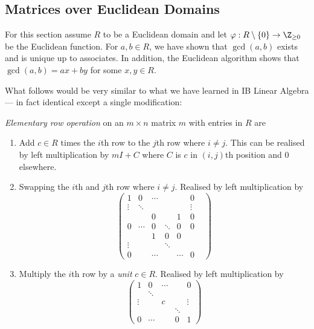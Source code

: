 \documentclass[a4paper]{article}
\begin{document}
\subsection{Matrices over Euclidean Domains}

For this section assume \(R\) to be a Euclidean domain and let \(\varphi: R \setminus \{0\} \to \Z_{\geq 0}\) be the Euclidean function. For \(a, b \in R\), we have shown that \(\gcd(a, b)\) exists and is unique up to associates. In addition, the Euclidean algorithm shows that \(\gcd(a, b) = ax + by\) for some \(x, y \in R\).

What follows would be very similar to what we have learned in IB Linear Algebra --- in fact identical except a single modification:

\begin{definition}
  \emph{Elementary row operation} on an \(m \times n\) matrix \(m\) with entries in \(R\) are
  \begin{enumerate}
  \item Add \(c \in R\) times the \(i\)th row to the \(j\)th row where \(i \neq j\). This can be realised by left multiplication by \(mI + C\) where \(C\) is \(c\) in \((i,j)\)th position and \(0\) elsewhere.
  \item Swapping the \(i\)th and \(j\)th row where \(i \neq j\). Realised by left multiplication by
  \[
    \begin{pmatrix}
      1 & 0 & \cdots & & & 0 \\
      \vdots & \ddots & & & & \vdots \\
      & & 0 & & 1 & 0 \\
      0 & \cdots & 0 & \ddots & 0 & 0 \\
      & & 1 & 0 & 0 & & \\
      \vdots & &&  \ddots & \\
      0 & & \cdots & & \cdots & 0
    \end{pmatrix}
  \]
\item Multiply the \(i\)th row by a \emph{unit} \(c \in R\). Realised by left multiplication by
  \[
    \begin{pmatrix}
      1 & 0 & \cdots & & 0 \\
       & \ddots & & & \\
      \vdots & & c & & \vdots \\
       & & & \ddots & \\
      0 & \cdots & & 0 & 1
    \end{pmatrix}
  \]
  \end{enumerate}
\end{definition}
\end{document}
